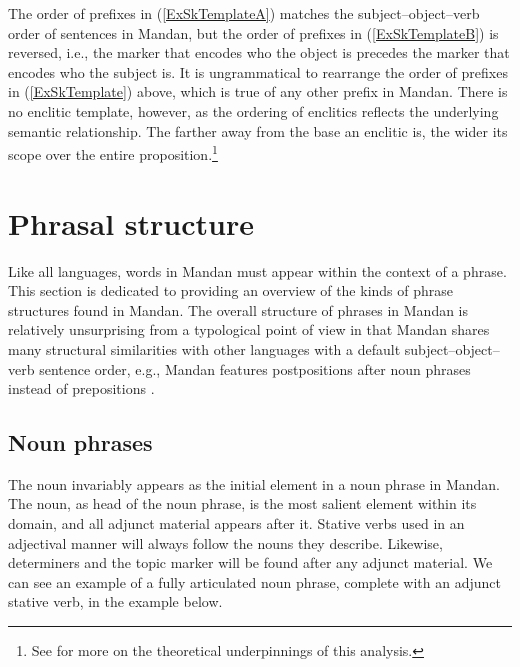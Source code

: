 The order of prefixes in (\ref{ExSkTemplateA}) matches the subject--object--verb order of sentences in Mandan, but the order of prefixes in (\ref{ExSkTemplateB}) is reversed, i.e., the marker that encodes who the object is precedes the marker that encodes who the subject is. It is ungrammatical to rearrange the order of prefixes in (\ref{ExSkTemplate}) above, which is true of any other prefix in Mandan. There is no enclitic template, however, as the ordering of enclitics reflects the underlying semantic relationship. The farther away from the base an enclitic is, the wider its scope over the entire proposition.\footnote{See \citet[319{ff}]{kasak2019} for more on the theoretical underpinnings of this analysis.}


\section{Phrasal structure}\label{CHSk5}

Like all languages, words in Mandan must appear within the context of a phrase. This section is dedicated to providing an overview of the kinds of phrase structures found in Mandan. The overall structure of phrases in Mandan is relatively unsurprising from a typological point of view in that Mandan shares many structural similarities with other languages with a default subject--object--verb sentence order, e.g., Mandan features postpositions after noun phrases instead of prepositions \citep[56]{croft2003}.

\subsection{Noun phrases}\label{CHSk5.1}


The noun  invariably appears as the initial element in a noun phrase in Mandan. The noun, as head of the noun phrase, is the most salient element within its domain, and all adjunct material appears after it. Stative verbs used in an adjectival manner will always follow the nouns they describe. Likewise, determiners and the topic marker will be found after any adjunct material. We can see an example of a fully articulated noun phrase, complete with an adjunct stative verb, in the example below. 

